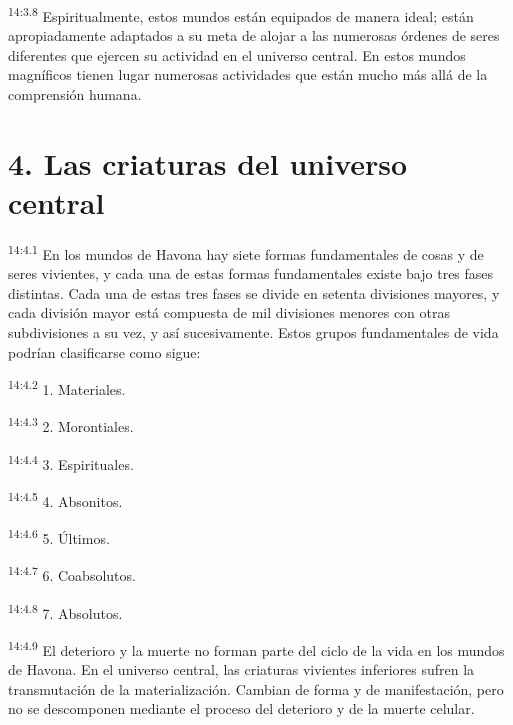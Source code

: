 \par
\textsuperscript{14:3.8} Espiritualmente, estos mundos están equipados de manera ideal; están apropiadamente adaptados a su meta de alojar a las numerosas órdenes de seres diferentes que ejercen su actividad en el universo central. En estos mundos magníficos tienen lugar numerosas actividades que están mucho más allá de la comprensión humana.

\section*{4. Las criaturas del universo central}
\par
\textsuperscript{14:4.1} En los mundos de Havona hay siete formas fundamentales de cosas y de seres vivientes, y cada una de estas formas fundamentales existe bajo tres fases distintas. Cada una de estas tres fases se divide en setenta divisiones mayores, y cada división mayor está compuesta de mil divisiones menores con otras subdivisiones a su vez, y así sucesivamente. Estos grupos fundamentales de vida podrían clasificarse como sigue:

\par
\textsuperscript{14:4.2} 1. Materiales.

\par
\textsuperscript{14:4.3} 2. Morontiales.

\par
\textsuperscript{14:4.4} 3. Espirituales.

\par
\textsuperscript{14:4.5} 4. Absonitos.

\par
\textsuperscript{14:4.6} 5. Últimos.

\par
\textsuperscript{14:4.7} 6. Coabsolutos.

\par
\textsuperscript{14:4.8} 7. Absolutos.

\par
\textsuperscript{14:4.9} El deterioro y la muerte no forman parte del ciclo de la vida en los mundos de Havona. En el universo central, las criaturas vivientes inferiores sufren la transmutación de la materialización. Cambian de forma y de manifestación, pero no se descomponen mediante el proceso del deterioro y de la muerte celular.

